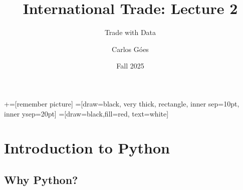 \documentclass[notes,11pt, aspectratio=169, xcolor=table]{beamer}
\title[]{International Trade: Lecture 2}
\subtitle[]{Trade with Data}
\author[Góes]
{Carlos Góes\inst{1}}
\date{Fall 2025}
\institute[GWU]{\inst{1} George Washington University }
\begin{document}
\newcommand\marktopleft[1]{%
    \tikz[overlay,remember picture] 
        \node (marker-#1-a) at (-.3em,.3em) {};%
}
\newcommand\markbottomright[2]{%
    \tikz[overlay,remember picture] 
        \node (marker-#1-b) at (0em,0em) {};%
}
+=[remember picture] 
 =[draw=black, very thick, rectangle, inner sep=10pt, inner ysep=20pt]
 =[draw=black,fill=red, text=white]















\frame{\titlepage}
\addtocounter{framenumber}{-1}




\section{Introduction to Python}

\subsection{Why Python?}
\end{document}
